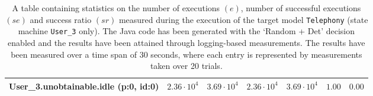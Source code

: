 \begin{table}[htbp]
{\begin{tabular}{lrrrrrr}
\hspace{3mm}User\_3.unobtainable.idle (p:0, id:0)     & $2.36 \cdot 10^{4}$ & $3.69 \cdot 10^{4}$ & $2.36 \cdot 10^{4}$ & $3.69 \cdot 10^{4}$ &               $1.00$ &               $0.00$ \\
\bottomrule
\end{tabular}
}
\caption{A table containing statistics on the number of executions $(e)$, number of successful executions $(se)$ and success ratio $(sr)$ measured during the execution of the target model \texttt{Telephony} (state machine \texttt{User\_3} only). The Java code has been generated with the `Random + Det' decision enabled and the results have been attained through logging-based measurements. The results have been measured over a time span of 30 seconds, where each entry is represented by measurements taken over 20 trials.}
\label{table:frequency_results_telephony_logging_user_3}
\end{table}